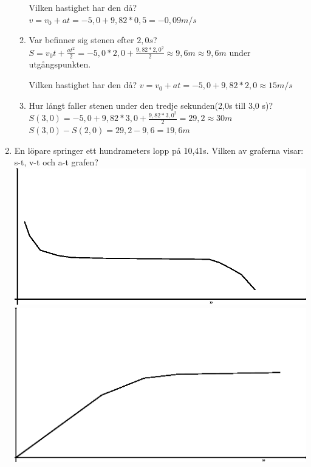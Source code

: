 \documentclass[a4paper,11pt]{article}
\begin{document}
\begin{flushleft}
\begin{enumerate}
\begin{enumerate}
    Vilken hastighet har den då?\newline
    $ v = v_0+at = -5,0+9,82*0,5 = -0,09m/s $\newline
    
    \item Var befinner sig stenen efter $2,0s$?\newline
    $ S = v_0t+\frac{at^2}{2} = -5,0*2,0+\frac{9,82*2,0^2}{2} \approx 9,6m \approx 9,6 m $ under utgångspunkten.\newline
    
    Vilken hastighet har den då?\newline
    $ v = v_0+at = -5,0+9,82*2,0 \approx 15 m/s $\newline
        
    \item Hur långt faller stenen under den tredje sekunden(2,0s till 3,0 s)?\newline
    $ S(3,0) = -5,0+9,82*3,0+\frac{9,82*3,0^2}{2} = 29,2 \approx 30m $
    $ S(3,0) - S(2,0) = 29,2 - 9,6 = 19,6m $\newline
  \end{enumerate}
  \item En löpare springer ett hundrameters lopp på 10,41s. Vilken av graferna visar: s-t, v-t och a-t grafen?\newline
  \includegraphics{spring1.eps}\newline
  \includegraphics{spring2.eps}\newline

\end{enumerate}
\end{flushleft}
\end{document}
